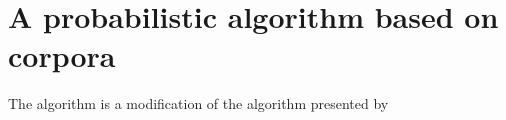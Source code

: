 \section{A probabilistic algorithm based on corpora}
\label{sec:algorithm}

The algorithm is a modification of the algorithm presented by \cite{arec2:2008:Areces}


\newcommand{\nBlue}{\mathit{blue}\xspace}
\newcommand{\nGreen}{\mathit{green}\xspace}
\newcommand{\nSmall}{\mathit{small}\xspace}
\newcommand{\nBig}{\mathit{big}\xspace}
\newcommand{\nBall}{\mathit{ball}\xspace}
\newcommand{\nCube}{\mathit{cube}\xspace}
\newcommand{\nOntop}{\mathit{ontop}\xspace}
\newcommand{\nBelow}{\mathit{below}\xspace}
\newcommand{\nRightof}{\mathit{rightof}\xspace}
\newcommand{\nLeftof}{\mathit{leftof}\xspace}

